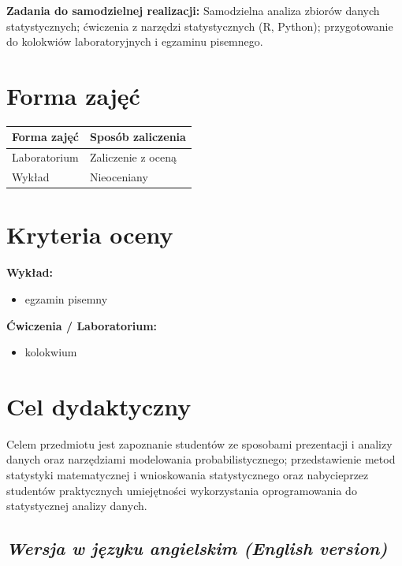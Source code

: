 \documentclass[12pt, a4paper]{article}
\newcommand{\thdrule}{\noalign{\global\setlength{\extrarowheight}{0pt}}}
\newcommand{\thdend}{\noalign{\global\setlength{\extrarowheight}{3pt}}}
\begin{document}
\vspace{4pt}
\noindent\textbf{Zadania do samodzielnej realizacji:} Samodzielna analiza zbiorów danych statystycznych; ćwiczenia z narzędzi statystycznych (R, Python); przygotowanie do kolokwiów laboratoryjnych i egzaminu pisemnego.

\section{Forma zajęć}

\begin{center}
{\scriptsize
\begin{tabular}{m{5cm}m{8cm}}
\thdrule\toprule
\rowcolor{pjatkRed} {\color{white}\textbf{Forma zajęć}} & {\color{white}\textbf{Sposób zaliczenia}} \\
\midrule\thdend
  \rowcolor{tableRowLight} Laboratorium & Zaliczenie z oceną \\
  \rowcolor{tableRowAlt} Wykład & Nieoceniany \\
\bottomrule
\end{tabular}}
\end{center}

\section{Kryteria oceny}

\textbf{Wykład:}
\begin{itemize}
  \item egzamin pisemny
\end{itemize}
\vspace{4pt}
\textbf{Ćwiczenia / Laboratorium:}
\begin{itemize}
  \item kolokwium
\end{itemize}


\section{Cel dydaktyczny}

Celem przedmiotu jest zapoznanie studentów ze sposobami prezentacji i analizy danych oraz narzędziami modelowania probabilistycznego; przedstawienie metod statystyki matematycznej i wnioskowania statystycznego oraz nabycieprzez studentów praktycznych umiejętności wykorzystania oprogramowania do statystycznej analizy danych.

\subsection*{\textit{Wersja w języku angielskim (English version)}}
\end{document}
